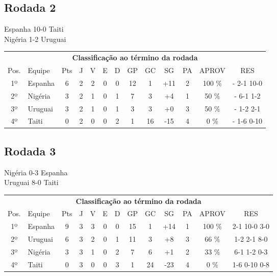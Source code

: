 \documentclass{article}
\begin{document}
\subsection*{Rodada 2}
Espanha 10-0 Taiti\\
Nigéria 1-2 Uruguai\\
\begin{center}
\begin{tabular}{| c | l | c | c | c | c | c | c | c | c | c | c | c |}
\multicolumn{13}{c}{\textbf{Classificação ao término da rodada}}\\
Pos.&Equipe&Pts&J&V&E&D&GP&GC&SG&PA&APROV&RES\\
1º&Espanha             &6&2	&2&0&0	&12&1&+11	&2&100 \%	& - 2-1 10-0 \\
2º&Nigéria             &3&2	&1&0&1	&7&3&+4	&1& 50 \%	& - 6-1 1-2 \\
3º&Uruguai             &3&2	&1&0&1	&3&3&+0	&3& 50 \%	& - 1-2 2-1 \\
4º&Taiti               &0&2	&0&0&2	&1&16&-15	&4&  0 \%	& - 1-6 0-10 \\
\end{tabular}
\end{center}


\subsection*{Rodada 3}
Nigéria 0-3 Espanha\\
Uruguai 8-0 Taiti\\
\begin{center}
\begin{tabular}{| c | l | c | c | c | c | c | c | c | c | c | c | c |}
\multicolumn{13}{c}{\textbf{Classificação ao término da rodada}}\\
Pos.&Equipe&Pts&J&V&E&D&GP&GC&SG&PA&APROV&RES\\
1º&Espanha             &9&3	&3&0&0	&15&1&+14	&1&100 \%	&2-1 10-0 3-0 \\
2º&Uruguai             &6&3	&2&0&1	&11&3&+8	&3& 66 \%	&1-2 2-1 8-0 \\
3º&Nigéria             &3&3	&1&0&2	&7&6&+1	&2& 33 \%	&6-1 1-2 0-3 \\
4º&Taiti               &0&3	&0&0&3	&1&24&-23	&4&  0 \%	&1-6 0-10 0-8 \\
\end{tabular}
\end{center}
\end{document}
